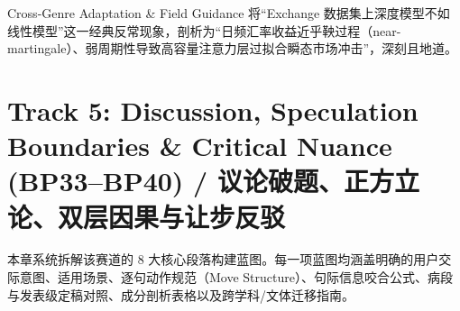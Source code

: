 \endgroup
\vspace{4pt}
\begin{TipBox}{Cross-Genre Adaptation \& Field Guidance}
将“Exchange 数据集上深度模型不如线性模型”这一经典反常现象，剖析为“日频汇率收益近乎鞅过程（near-martingale）、弱周期性导致高容量注意力层过拟合瞬态市场冲击”，深刻且地道。
\end{TipBox}
\vspace{8pt}
\chapter{Track 5: Discussion, Speculation Boundaries \& Critical Nuance (BP33--BP40) / 议论破题、正方立论、双层因果与让步反驳}\label{ch:track_15}
本章系统拆解该赛道的 8 大核心段落构建蓝图。每一项蓝图均涵盖明确的用户交际意图、适用场景、逐句动作规范（Move Structure）、句际信息咬合公式、病段与发表级定稿对照、成分剖析表格以及跨学科/文体迁移指南。


